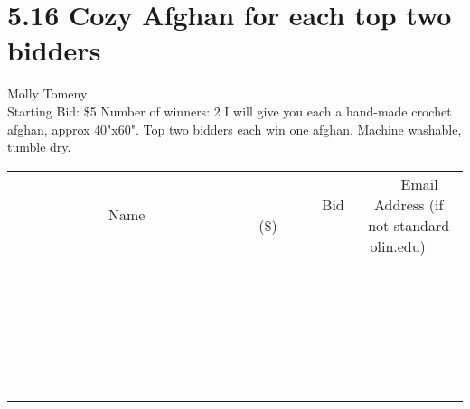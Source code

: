 \documentclass[11pt]{article}
\begin{document}
\section*{5.16 Cozy Afghan for each top two bidders}
Molly Tomeny
\\
Starting Bid: \$5
\newline
Number of winners: 2
\newline
I will give you each a hand-made crochet afghan, approx 40"x60". Top two bidders each win one afghan. Machine washable, tumble dry.
\\[6ex]
\begin{tabular}{c c c}
~~~~~~~~~~~~~Name~~~~~~~~~~~~~ & ~~~~~~~~~Bid (\$)~~~~~~~~~  & ~~~Email Address (if not standard olin.edu)~~~\\
 & & \\
\hline
 & & \\
\hline
 & & \\
\hline
 & & \\
\hline
 & & \\
\hline
 & & \\
\hline
 & & \\
\hline
 & & \\
\hline
 & & \\
\hline
 & & \\
\hline
 & & \\
\hline
 & & \\
\hline
 & & \\
\hline
 & & \\
\hline
 & & \\
\hline
 & & \\
\hline
 & & \\
\hline
 & & \\
\hline
 & & \\
\hline
 & & \\
\hline
 & & \\
\hline
 & & \\
\hline
 & & \\
\hline
 & & \\
\hline
 & & \\
\hline
 & & \\
\hline
\end{tabular}
\newpage
\end{document}

